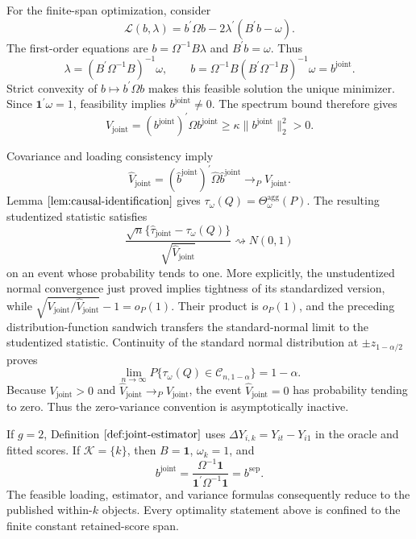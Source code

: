For the finite-span optimization, consider
\[
 \mathcal L(b,\lambda)=b^{\prime}\Omega b
 -2\lambda^{\prime}(B^{\prime}b-\omega).
\]
The first-order equations are \(b=\Omega^{-1}B\lambda\) and \(B^{\prime}b=\omega\).  Thus
\[
 \lambda=(B^{\prime}\Omega^{-1}B)^{-1}\omega,
 \qquad
 b=\Omega^{-1}B(B^{\prime}\Omega^{-1}B)^{-1}\omega=b^{\mathrm{joint}}.
\]
Strict convexity of \(b\mapsto b^{\prime}\Omega b\) makes this feasible solution the unique minimizer.  Since \(\mathbf 1^{\prime}\omega=1\), feasibility implies \(b^{\mathrm{joint}}\ne0\).  The spectrum bound therefore gives
\[
 V_{\mathrm{joint}}
 =(b^{\mathrm{joint}})^{\prime}\Omega b^{\mathrm{joint}}
 \ge\kappa\|b^{\mathrm{joint}}\|_2^2>0.
\]

Covariance and loading consistency imply
\[
 \widehat V_{\mathrm{joint}}
 =(\widehat b^{\mathrm{joint}})^{\prime}
 \widehat\Omega\widehat b^{\mathrm{joint}}
 \to_PV_{\mathrm{joint}}.
\]
Lemma \(\ref{lem:causal-identification}\) gives \(\tau_\omega(Q)=\Theta_\omega^{\mathrm{agg}}(P)\).  The resulting studentized statistic satisfies
\[
 \frac{\sqrt n\{\widehat\tau_{\mathrm{joint}}-\tau_\omega(Q)\}}
      {\sqrt{\widehat V_{\mathrm{joint}}}}
 \rightsquigarrow N(0,1)
\]
on an event whose probability tends to one.  More explicitly, the unstudentized normal convergence just proved implies tightness of its standardized version, while \(\sqrt{V_{\mathrm{joint}}/\widehat V_{\mathrm{joint}}}-1=o_P(1)\).  Their product is \(o_P(1)\), and the preceding distribution-function sandwich transfers the standard-normal limit to the studentized statistic.  Continuity of the standard normal distribution at \(\pm z_{1-\alpha/2}\) proves
\[
 \lim_{n\to\infty}P\{\tau_\omega(Q)\in\mathcal C_{n,1-\alpha}\}=1-\alpha.
\]
Because \(V_{\mathrm{joint}}>0\) and \(\widehat V_{\mathrm{joint}}\to_PV_{\mathrm{joint}}\), the event \(\widehat V_{\mathrm{joint}}=0\) has probability tending to zero.  Thus the zero-variance convention is asymptotically inactive.

If \(g=2\), Definition \(\ref{def:joint-estimator}\) uses \(\Delta Y_{i,k}=Y_{it}-Y_{i1}\) in the oracle and fitted scores.  If \(\mathcal K=\{k\}\), then \(B=\mathbf 1\), \(\omega_k=1\), and
\[
 b^{\mathrm{joint}}
 =\frac{\Omega^{-1}\mathbf 1}{\mathbf 1^{\prime}\Omega^{-1}\mathbf 1}
 =b^{\mathrm{sep}}.
\]
The feasible loading, estimator, and variance formulas consequently reduce to the published within-\(k\) objects.  Every optimality statement above is confined to the finite constant retained-score span.